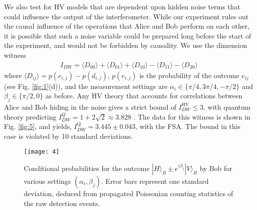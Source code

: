 \documentclass[aps,prl,twocolumn,amsmath,amssymb,nofootinbib,superscriptaddress]{revtex4-1}
\begin{document}



We also test for HV models that are dependent upon hidden noise terms that could influence the output of the interferometer.   While our experiment rules out the causal influence of the operations that Alice and Bob perform on each other, it is possible that such a noise variable could be prepared long before the start of the experiment, and would not be forbidden by causality.  We use the dimension witness  \cite{gallego2010device,ahrens2012experimental}
%
\begin{align}
{I_{DW}} = \langle {D_{00}}\rangle  + \langle {D_{01}}\rangle  + \langle {D_{10}}\rangle  - \langle {D_{11}}\rangle  - \langle {D_{20}}\rangle
\end{align}
%
where  $ \langle {D_{ij}}\rangle  = p(e_{i,j}) - p(d_{i,j}) $, $ p(e_{i,j}) $ is the probability of the outcome $ e_{ij} $ (see Fig. \ref{fig:1}(d)), and the measurement settings are  $ \alpha_i \in  \{ \pi/4,  3\pi /4, - \pi /2 \} $ and  $\beta_j \in \{\pi /2,  0 \}$ as before.   Any HV theory that accounts for correlations between Alice and Bob hiding in the noise gives a strict bound of $I_{DW}^{\text{HV}} \le 3$, with quantum theory predicting $I_{DW}^Q = 1 + 2\sqrt 2  \approx 3.828$ \cite{Chaves2018, tavakoli2018self}. The data for this witness is shown in Fig. \ref{fig:5}, and yields, $I_{DW}^\text{Q} = 3.445 \pm 0.043$, with the FSA. The bound in this case is violated by 10 standard deviations. 






\begin{figure}[t]
\texttt{[image: 4]}
\caption{Conditional probabilities for the outcome $ |H{\rangle _B} \pm {e^{i{\beta_j}}}|V{\rangle _B} $ by Bob for various 
settings $ (\alpha_i, \beta_j ) $.  Error bars represent one standard deviation, deduced from propagated Poissonian counting statistics of the raw detection events.} \label{fig:4}
\end{figure}
\end{document}
